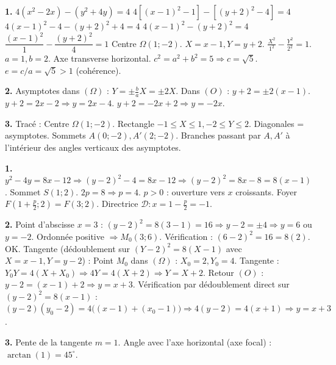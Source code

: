 \documentclass[11pt]{article}
\begin{document}
\begin{corrige}[Exercice 2]
\textbf{1.} $4(x^2-2x) - (y^2+4y) = 4$
$4[(x-1)^2-1] - [(y+2)^2-4] = 4$
$4(x-1)^2 - 4 - (y+2)^2 + 4 = 4$
$4(x-1)^2 - (y+2)^2 = 4$
$\dfrac{(x-1)^2}{1} - \dfrac{(y+2)^2}{4} = 1$
Centre $\Omega(1;-2)$. $X=x-1, Y=y+2$. $\frac{X^2}{1^2} - \frac{Y^2}{2^2} = 1$.
$a=1, b=2$. Axe transverse horizontal.
$c^2 = a^2+b^2 = 5 \Rightarrow c=\sqrt{5}$.
$e = c/a = \sqrt{5} > 1$ (cohérence).

\textbf{2.} Asymptotes dans $(\Omega)$ : $Y = \pm \frac{b}{a}X = \pm 2X$.
Dans $(O)$ : $y+2 = \pm 2(x-1)$.
$y+2 = 2x-2 \Rightarrow y = 2x-4$.
$y+2 = -2x+2 \Rightarrow y = -2x$.

\textbf{3.} Tracé : Centre $\Omega(1;-2)$. Rectangle $-1\le X\le 1, -2\le Y\le 2$. Diagonales = asymptotes. Sommets $A(0;-2), A'(2;-2)$. Branches passant par $A, A'$ à l'intérieur des angles verticaux des asymptotes.
\end{corrige}

\begin{corrige}[Exercice 3]
\textbf{1.} $y^2-4y = 8x-12 \Rightarrow (y-2)^2 - 4 = 8x-12 \Rightarrow (y-2)^2 = 8x-8 = 8(x-1)$.
Sommet $S(1;2)$. $2p=8 \Rightarrow p=4$. $p>0$ : ouverture vers $x$ croissants.
Foyer $F(1+\frac{p}{2}; 2) = F(3;2)$.
Directrice $\mathcal{D}: x = 1-\frac{p}{2} = -1$.

\textbf{2.} Point d'abscisse $x=3$ : $(y-2)^2 = 8(3-1) = 16 \Rightarrow y-2 = \pm 4 \Rightarrow y = 6$ ou $y=-2$.
Ordonnée positive $\Rightarrow M_0(3;6)$. Vérification : $(6-2)^2=16=8(2)$. OK.
Tangente (dédoublement sur $(Y-2)^2=8(X-1)$ avec $X=x-1, Y=y-2$) :
Point $M_0$ dans $(\Omega)$ : $X_0=2, Y_0=4$.
Tangente : $Y_0 Y = 4(X+X_0) \Rightarrow 4Y = 4(X+2) \Rightarrow Y = X+2$.
Retour $(O)$ : $y-2 = (x-1)+2 \Rightarrow y = x+3$.
Vérification par dédoublement direct sur $(y-2)^2 = 8(x-1)$ : $(y-2)(y_0-2) = 4\big((x-1) + (x_0-1)\big) \Rightarrow 4(y-2) = 4(x+1) \Rightarrow \boxed{y = x+3}$.

\textbf{3.} Pente de la tangente $m=1$. Angle avec l'axe horizontal (axe focal) : $\arctan(1) = 45^\circ$.
\end{corrige}
\end{document}
